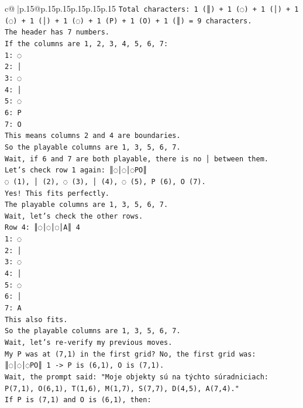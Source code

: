 \documentclass{article}
\begin{document}
{\begin{supertabular}{c@{$\;$}|p{.15\linewidth}@{}p{.15\linewidth}p{.15\linewidth}p{.15\linewidth}p{.15\linewidth}p{.15\linewidth}}
{{{\texttt{Total characters: 1 (║) + 1 (◌) + 1 (│) + 1 (◌) + 1 (│) + 1 (◌) + 1 (P) + 1 (O) + 1 (║) = 9 characters.} \\
\texttt{The header has 7 numbers.} \\
\texttt{If the columns are 1, 2, 3, 4, 5, 6, 7:} \\
\texttt{1: ◌} \\
\texttt{2: │} \\
\texttt{3: ◌} \\
\texttt{4: │} \\
\texttt{5: ◌} \\
\texttt{6: P} \\
\texttt{7: O} \\
\texttt{This means columns 2 and 4 are boundaries.} \\
\texttt{So the playable columns are 1, 3, 5, 6, 7.} \\
\texttt{Wait, if 6 and 7 are both playable, there is no │ between them.} \\
\texttt{Let's check row 1 again: ║◌│◌│◌PO║} \\
\texttt{◌ (1), │ (2), ◌ (3), │ (4), ◌ (5), P (6), O (7).} \\
\texttt{Yes! This fits perfectly.} \\
\texttt{The playable columns are 1, 3, 5, 6, 7.} \\
\texttt{Wait, let's check the other rows.} \\
\texttt{Row 4: ║◌│◌│◌│A║ 4} \\
\texttt{1: ◌} \\
\texttt{2: │} \\
\texttt{3: ◌} \\
\texttt{4: │} \\
\texttt{5: ◌} \\
\texttt{6: │} \\
\texttt{7: A} \\
\texttt{This also fits.} \\
\texttt{So the playable columns are 1, 3, 5, 6, 7.} \\
\texttt{Wait, let's re{-}verify my previous moves.} \\
\texttt{My P was at (7,1) in the first grid? No, the first grid was:} \\
\texttt{║◌│◌│◌PO║ 1 {-}> P is (6,1), O is (7,1).} \\
\texttt{Wait, the prompt said: "Moje objekty sú na týchto súradniciach: P(7,1), O(6,1), T(1,6), M(1,7), S(7,7), D(4,5), A(7,4)."} \\
\texttt{If P is (7,1) and O is (6,1), then:} \\
}}}
\end{supertabular}}
\end{document}
